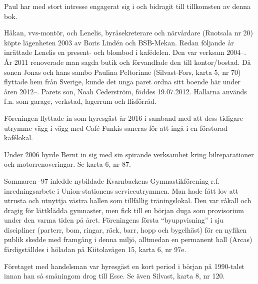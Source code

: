 Paul har med stort intresse engagerat sig i och bidragit till tillkomsten av denna bok.



%



%
Håkan, vvs-montör, och Lenelis, byråsekreterare och närvårdare (Ruotsala nr 20) köpte lägenheten 2003 av Boris Lindén och BSB-Mekan. Redan följande år inrättade Lenelis en present- och blombod 	i kafédelen. Den var verksam 2004--. År 2011 renoverade man sagda butik och förvandlade den till	kontor/bostad. Då sonen Jonas och hans sambo Paulina Peltorinne	(Silvast-Fors, karta 5, nr 70) flyttade hem från Sverige, kunde det unga paret ordna sitt boende här under åren 2012--. Parets son, Noah Cederström, föddes 19.07.2012.
Hallarna används f.n. som garage, verkstad, lagerrum och flisförråd.



%
Föreningen flyttade in som hyresgäst år 2016 i samband med att dess tidigare utrymme vägg i vägg med Café Funkis saneras för att ingå i en förstorad kafélokal.\jhvspace{}


%
Under 2006 hyrde Bernt in sig med sin spirande verksamhet kring bilreparationer och motorrenoveringar. Se karta 6, nr 87.\jhvspace{}


%
Sommaren -97 inledde nybildade Kvarnbackens Gymnastikförening r.f. inredningsarbete i Union-stationens serviceutrymmen. Man hade fått lov att utrusta och utnyttja västra hallen som tillfällig träningslokal. Den var råkall och dragig för lättklädda gymnaster, men fick till en början duga som provisorium under den varma tiden på året. Föreningens första	``byuppvisning'' i sju discipliner (parterr, bom, ringar, räck, barr, hopp 	och bygelhäst) för en nyfiken publik skedde med framgång i denna miljö, alltmedan en permanent hall (Arcas) färdigställdes i höladan på Kiitolavägen 15, karta 6, nr 97e.


%
Företaget med handelsman  var hyresgäst en kort period i början på 1990-talet innan han så småningom drog till Esse. Se även Silvast, karta 8, nr 120.\jhvspace{}


